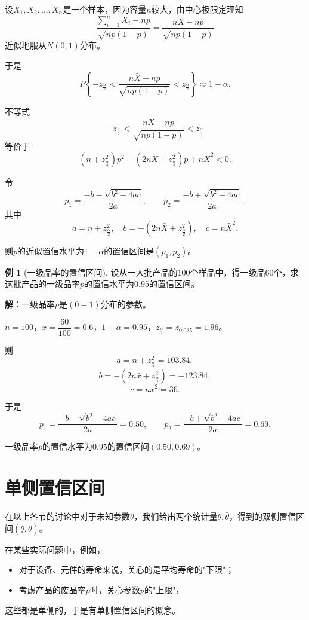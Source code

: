 \documentclass[11pt,a4paper]{report}
\theoremstyle{definition}
\newtheorem{example}{例}[chapter]
\begin{document}
设$X_{1},X_{2},\ldots,X_{n}$是一个样本，因为容量$n$较大，由中心极限定理知
\[
\frac{\sum_{i=1}^{n}X_{i}-np}{\sqrt{np(1-p)}}=\frac{n\bar{X}-np}{\sqrt{np(1-p)}}
\]
近似地服从$N(0,1)$分布。

于是
\[
P\left\{-z_{\frac{\alpha}{2}}<\frac{n\bar{X}-np}{\sqrt{np(1-p)}}<z_{\frac{\alpha}{2}}\right\}\approx1-\alpha.
\]

不等式
\[
-z_{\frac{\alpha}{2}}<\frac{n\bar{X}-np}{\sqrt{np(1-p)}}<z_{\frac{\alpha}{2}}
\]
等价于
\[
\left(n+z_{\frac{\alpha}{2}}^{2}\right)p^{2}-\left(2n\bar{X}+z_{\frac{\alpha}{2}}^{2}\right)p+n\bar{X}^{2}<0.
\]

令
\[
p_{1}=\frac{-b-\sqrt{b^{2}-4ac}}{2a},\qquad p_{2}=\frac{-b+\sqrt{b^{2}-4ac}}{2a},
\]
其中
\[
a=n+z_{\frac{\alpha}{2}}^{2},\quad b=-(2n\bar{X}+z_{\frac{\alpha}{2}}^{2}),\quad c=n\bar{X}^{2}.
\]

则$p$的近似置信水平为$1-\alpha$的置信区间是$(p_{1},p_{2})$。

\begin{example}[一级品率的置信区间]
设从一大批产品的$100$个样品中，得一级品$60$个，求这批产品的一级品率$p$的置信水平为$0.95$的置信区间。

\textbf{解}：一级品率$p$是$(0-1)$分布的参数。

$n=100$，$\bar{x}=\dfrac{60}{100}=0.6$，$1-\alpha=0.95$，$z_{\frac{\alpha}{2}}=z_{0.025}=1.96$。

则
\[
a=n+z_{\frac{\alpha}{2}}^{2}=103.84,
\]
\[
b=-(2n\bar{x}+z_{\frac{\alpha}{2}}^{2})=-123.84,
\]
\[
c=n\bar{x}^{2}=36.
\]

于是
\[
p_{1}=\frac{-b-\sqrt{b^{2}-4ac}}{2a}=0.50,\qquad p_{2}=\frac{-b+\sqrt{b^{2}-4ac}}{2a}=0.69.
\]

一级品率$p$的置信水平为$0.95$的置信区间$(0.50,0.69)$。
\end{example}

\section{单侧置信区间}

在以上各节的讨论中对于未知参数$\theta$，我们给出两个统计量$\underline{\theta},\bar{\theta}$，得到的双侧置信区间$(\underline{\theta},\bar{\theta})$。

在某些实际问题中，例如，
\begin{itemize}[leftmargin=2em]
    \item 对于设备、元件的寿命来说，关心的是平均寿命的"下限"；
    \item 考虑产品的废品率$p$时，关心参数$p$的"上限"，
\end{itemize}
这些都是单侧的，于是有单侧置信区间的概念。
\end{document}
